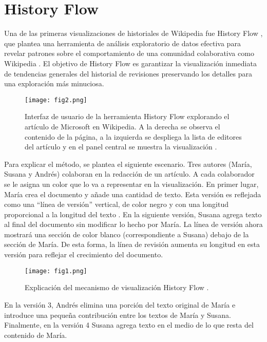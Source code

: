 \section{History Flow}
Una de las primeras visualizaciones de historiales de Wikipedia fue History Flow \cite{Vie04}, que plantea una herramienta de análisis exploratorio de datos efectiva para revelar patrones sobre el comportamiento de una comunidad colaborativa como Wikipedia . El objetivo de History Flow es garantizar la visualización inmediata de tendencias generales del historial de revisiones preservando los detalles para una exploración más minuciosa.

\begin{figure}[htp]
  \centering
  \texttt{[image: fig2.png]}
  \caption[Interfaz de usuario de la herramienta History Flow]{Interfaz de usuario de la herramienta History Flow explorando el artículo de Microsoft en Wikipedia. A la derecha se observa el contenido de la página, a la izquierda se despliega la lista de editores del artículo y en el panel central se muestra la visualización \cite[Fig. 3]{Vie04}.}
  \label{fig:fig2}
\end{figure}

Para explicar el método, se plantea el siguiente escenario. Tres autores (María, Susana y Andrés) colaboran en la redacción de un artículo. A cada colaborador se le asigna un color que lo va a representar en la visualización. En primer lugar, María crea el documento y añade una cantidad de texto. Esta versión es reflejada como una “línea de versión” vertical, de color negro y con una longitud proporcional a la longitud del texto . En la siguiente versión, Susana agrega texto al final del documento sin modificar lo hecho por María. La línea de versión ahora mostrará una sección de color blanco (correspondiente a Susana) debajo de la sección de María. De esta forma, la línea de revisión aumenta su longitud en esta versión para reflejar el crecimiento del documento.

\begin{figure}[htp]
  \centering
  \texttt{[image: fig1.png]}
  \caption[Explicación del mecanismo de visualización History Flow]{Explicación del mecanismo de visualización History Flow \cite[Fig. 2]{Vie04}.}
  \label{fig:fig1}
\end{figure}

En la versión 3, Andrés elimina una porción del texto original de María e introduce una pequeña contribución entre los textos de María y Susana. Finalmente, en la versión 4 Susana agrega texto en el medio de lo que resta del contenido de María.

